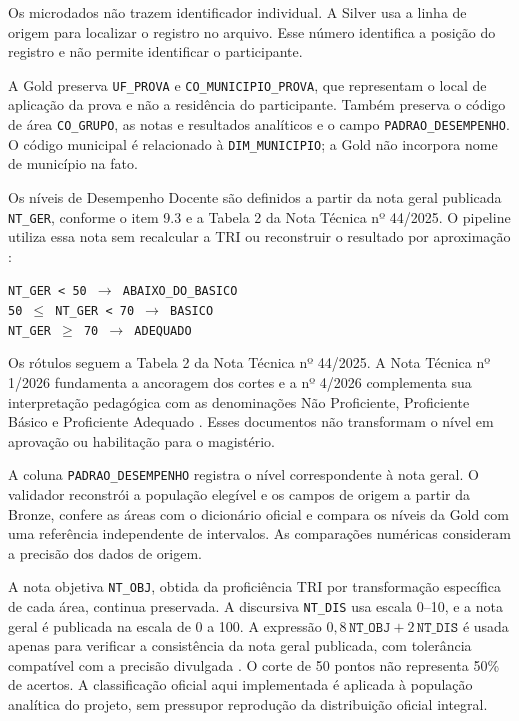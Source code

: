 Os microdados não trazem identificador individual. A Silver usa a linha de origem para localizar o registro no arquivo. Esse número identifica a posição do registro e não permite identificar o participante.

A Gold preserva \texttt{UF\_PROVA} e \texttt{CO\_MUNICIPIO\_PROVA}, que representam o local de aplicação da prova e não a residência do participante. Também preserva o código de área \texttt{CO\_GRUPO}, as notas e resultados analíticos e o campo \texttt{PADRAO\_DESEMPENHO}. O código municipal é relacionado à \texttt{DIM\_MUNICIPIO}; a Gold não incorpora nome de município na fato.

Os níveis de Desempenho Docente são definidos a partir da nota geral publicada \texttt{NT\_GER}, conforme o item 9.3 e a Tabela 2 da Nota Técnica nº 44/2025. O pipeline utiliza essa nota sem recalcular a TRI ou reconstruir o resultado por aproximação \cite[p.~6]{inep2025notatecnica44}:

\begin{center}
\texttt{NT\_GER < 50 $\rightarrow$ ABAIXO\_DO\_BASICO}\\
\texttt{50 $\leq$ NT\_GER < 70 $\rightarrow$ BASICO}\\
\texttt{NT\_GER $\geq$ 70 $\rightarrow$ ADEQUADO}
\end{center}

Os rótulos seguem a Tabela 2 da Nota Técnica nº 44/2025. A Nota Técnica nº 1/2026 fundamenta a ancoragem dos cortes e a nº 4/2026 complementa sua interpretação pedagógica com as denominações Não Proficiente, Proficiente Básico e Proficiente Adequado \cite{inep2026notatecnica1,inep2026notatecnica4}. Esses documentos não transformam o nível em aprovação ou habilitação para o magistério.

A coluna \texttt{PADRAO\_DESEMPENHO} registra o nível correspondente à nota geral. O validador reconstrói a população elegível e os campos de origem a partir da Bronze, confere as áreas com o dicionário oficial e compara os níveis da Gold com uma referência independente de intervalos. As comparações numéricas consideram a precisão dos dados de origem.

A nota objetiva \texttt{NT\_OBJ}, obtida da proficiência TRI por transformação específica de cada área, continua preservada. A discursiva \texttt{NT\_DIS} usa escala 0--10, e a nota geral é publicada na escala de 0 a 100. A expressão $0{,}8\,\texttt{NT\_OBJ}+2\,\texttt{NT\_DIS}$ é usada apenas para verificar a consistência da nota geral publicada, com tolerância compatível com a precisão divulgada \cite[p.~5--6]{inep2025notatecnica44}. O corte de 50 pontos não representa 50\% de acertos. A classificação oficial aqui implementada é aplicada à população analítica do projeto, sem pressupor reprodução da distribuição oficial integral.

